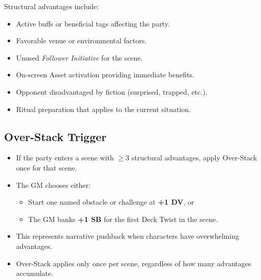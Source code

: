 Structural advantages include:
\begin{itemize}
\item Active buffs or beneficial tags affecting the party. 
\item Favorable venue or environmental factors. 
\item Unused \emph{Follower Initiative} for the scene. 
\item On-screen Asset activation providing immediate benefits. 
\item Opponent disadvantaged by fiction (surprised, trapped, etc.). 
\item Ritual preparation that applies to the current situation. 
\end{itemize}

\subsection{Over-Stack Trigger}
\label{subsec:overstack-trigger}

\begin{itemize}
\item If the party enters a scene with $\geq 3$ structural advantages, apply Over-Stack once for that scene.
\item The GM chooses either:
  \begin{itemize}
  \item Start one named obstacle or challenge at \textbf{+1 DV}, or 
  \item The GM banks \textbf{+1 SB} for the first Deck Twist in the scene. 
  \end{itemize}
\item This represents narrative pushback when characters have overwhelming advantages.
\item Over-Stack applies only once per scene, regardless of how many advantages accumulate.
\end{itemize}
